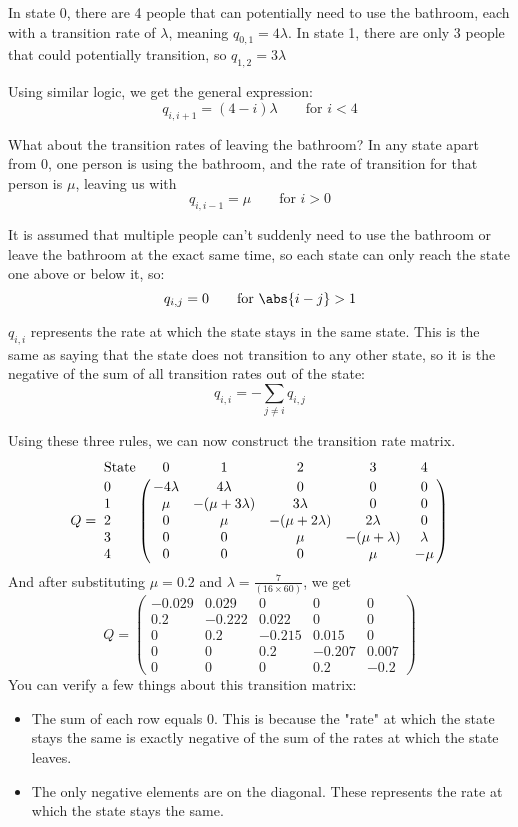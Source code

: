 In state 0, there are 4 people that can potentially need to use the bathroom, each with a transition rate of $\lambda$, meaning $q_{0, 1} = 4\lambda$. In state 1, there are only 3 people that could potentially transition, so $q_{1, 2} = 3\lambda$

Using similar logic, we get the general expression:
$$q_{i, i+1} = (4-i)\lambda \qquad \text{for } i < 4 $$

What about the transition rates of leaving the bathroom? In any state apart from 0, one person is using the bathroom, and the rate of transition for that person is $\mu$, leaving us with 
$$q_{i, i-1}=\mu \qquad \text{for } i > 0$$

It is assumed that multiple people can't suddenly need to use the bathroom or leave the bathroom at the exact same time, so each state can only reach the state one above or below it, so:
$$q_{i, j} = 0 \qquad \text{for } \abs{i-j}>1 $$

$q_{i, i}$ represents the rate at which the state stays in the same state. This is the same as saying that the state does not transition to any other state, so it is the negative of the sum of all transition rates out of the state:
$$q_{i, i} = -\sum_{j \neq i} q_{i, j} $$


Using these three rules, we can now construct the transition rate matrix.
$$
Q=
\bordermatrix{	\text{State} 	&\text{0} 	&\text{1}	& \text{2} 	& \text{3} 	& \text{4} \cr
\text{0} 	& -4\lambda &	4\lambda	&	0 			& 0 			& 0	\cr
\text{1} 	&   \mu  	&-(\mu+3\lambda)&3\lambda 		& 0 			& 0	\cr
\text{2} 	&   0  		&	\mu			&-(\mu+2\lambda)&2\lambda 		& 0	\cr
\text{3} 	&   0  		&	0			&	\mu 		&-(\mu+\lambda)	& \lambda\cr
\text{4}	&	0		&	0			&	0			& \mu 			& -\mu}
$$
And after substituting $\mu = 0.2 $ and $\lambda = \frac{7}{(16 \times 60)} $, we get
$$ Q=
\begin{pmatrix}
-0.029	&	0.029	&	0 		& 0 		& 0	\\
0.2  	&	-0.222	& 0.022 	& 0 		& 0	\\
0  		&	0.2		&-0.215		&0.015 		& 0	\\
0  		&	0		&	0.2 	&-0.207		& 0.007\\
0		&	0		&	0		& 0.2 		& -0.2
\end{pmatrix}
$$
You can verify a few things about this transition matrix:
\begin{itemize}
	\item The sum of each row equals 0. This is because the "rate" at which the state stays the same is exactly negative of the sum of the rates at which the state leaves.
	\item The only negative elements are on the diagonal. These represents the rate at which the state stays the same.
\end{itemize}


